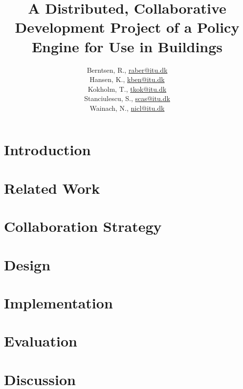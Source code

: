 \documentclass[11pt]{report}
\title{A Distributed, Collaborative Development Project of a Policy Engine for Use in Buildings\\\scalebox{0.85}{Global Software Development}}
\author{Berntsen, R., \url{raber@itu.dk}\\Hansen, K., \url{kben@itu.dk}\\Kokholm, T., \url{tkok@itu.dk}\\Stanciulescu, S., \url{scas@itu.dk}\\Wainach, N., \url{nicl@itu.dk}}
\begin{document}
\maketitle
{}
\begin{abstract}

\end{abstract}

\tableofcontents
\clearpage
{}



\chapter{Introduction}\label{chapter:introduction}


\chapter{Related Work}\label{chapter:relatedwork}


\chapter{Collaboration Strategy}\label{chapter:method}


\chapter{Design}\label{chapter:design}


\chapter{Implementation}\label{chapter:implementation}



\chapter{Evaluation}\label{chapter:evaluation}


\chapter{Discussion}\label{chapter:discussion}

\end{document}
